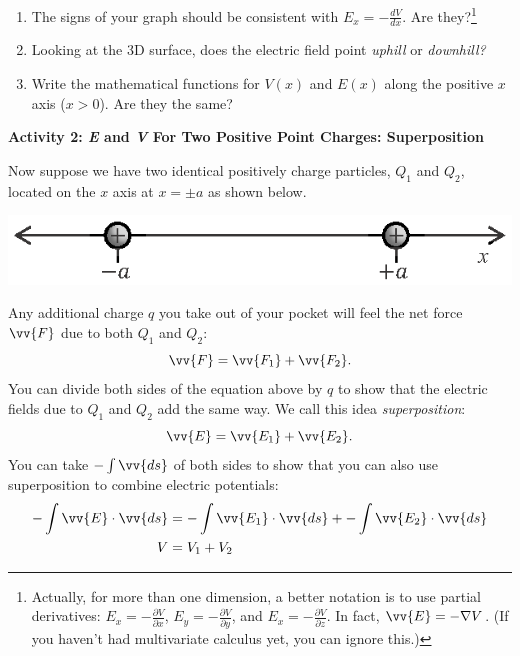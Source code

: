\begin{enumerate}[labparts]
\item The signs of your graph should be consistent with 
$\displaystyle E_x=-\frac{dV}{dx}$. Are they?\footnote{Actually, for more than one dimension, a better notation is to use partial derivatives: 
$\displaystyle E_x=-\frac{\partial V}{\partial x}$,  
$\displaystyle E_y=-\frac{\partial V}{\partial y}$, and 
$\displaystyle E_x=-\frac{\partial V}{\partial z}$.
In fact, $\vv{E}=-\nabla V$.  (If you haven't had multivariate calculus yet, you can ignore this.)}
\answerspace{0.3in}

\item Looking at the 3D surface, does the electric field point \textit{uphill} or \textit{downhill?}
\answerspace{0.3in}

\item Write the mathematical functions for $V(x)$ and $E(x)$ along the positive $x$ axis ($x > 0$).  Are they the same?
\answerspace{0.3in}

\end{enumerate}

\textbf{Activity 2: \textit{E} and \textit{V} For Two Positive Point Charges: Superposition}

Now suppose we have two identical positively charge particles, $Q_1$ and $Q_2$, located on the $x$ axis at $x= \pm a$ as shown below.
\begin{center}
\includegraphics{potential_superposition/activity_2_3_figs/charges_on_x_axis.eps}
\end{center}

Any additional charge $q$ you take out of your pocket will feel the net force $\vv{F}$ due to both $Q_1$ and $Q_2$:
$$\vv{F} = \vv{F_1} + \vv{F_2}.$$
You can divide both sides of the equation above by $q$ to show that the electric fields due to $Q_1$ and $Q_2$ add the same way.  We call this idea \textit{superposition}:
$$\vv{E} = \vv{E_1} + \vv{E_2}.$$
You can take $-\int \vv{ds}$ of both sides to show that you can also use superposition to combine electric potentials:
\begin{align*}
-\int{\vv{E} \cdot \vv{ds}} %
&= -\int{\vv{E_1} \cdot \vv{ds}} + -\int{\vv{E_2} \cdot \vv{ds}} \\
V &= V_1 + V_2
\end{align*}

